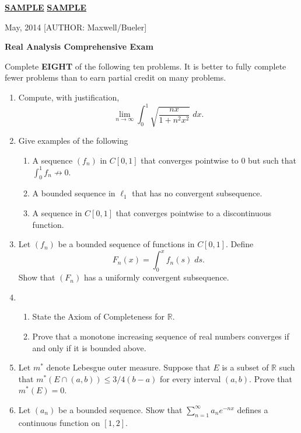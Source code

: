 \documentclass[12pt]{article}
\def\ra{\rightarrow}
\def\Reals{{\mathbb R}}
\begin{document}
\thispagestyle{empty}
\Large \noindent \underline{\textbf{SAMPLE}} \hfill\underline{\textbf{SAMPLE}}

\scriptsize {} May, 2014  \hfill  \tiny [AUTHOR: Maxwell/Bueler]
\normalsize\bigskip

\centerline{\large\textbf{Real Analysis Comprehensive Exam}} 
\bigskip

Complete {\bf EIGHT} of the following ten problems.  It is better to fully
complete fewer problems than to earn partial credit on many problems.
\bigskip
\begin{enumerate}

\item Compute, with justification, 
$$
\lim_{n\to\infty} \int_0^1 \sqrt{\frac{nx}{1+n^2x^2}}\; dx.
$$

\item Give examples of the following
\begin{enumerate}
	\item A sequence $(f_n)$ in $C[0,1]$ that converges pointwise to $0$
	 but such that $\int_0^1 f_n\not\ra 0$.  
	\item A bounded sequence in $\ell_1$ that has no convergent subsequence.
	\item A sequence in $C[0,1]$ that converges pointwise to a discontinuous function.
\end{enumerate}	

\item Let $(f_n)$ be a bounded sequence of functions in $C[0,1]$.
Define
$$
F_n(x) = \int_0^x f_n(s)\; ds.
$$
Show that $(F_n)$ has a uniformly convergent subsequence.

\item 
\begin{enumerate}
	\item State the Axiom of Completeness for $\Reals$.
	\item Prove that a monotone increasing sequence of real numbers converges if and only
	if it is bounded above.
\end{enumerate}

\item Let $m^*$ denote Lebesgue outer measure.  Suppose that $E$ is a subset of $\Reals$
such that $m^*(E\cap (a,b)) \le 3/4 (b-a)$ for every interval $(a,b)$. Prove that
$m^*(E)=0$.

\item Let $(a_n)$ be a bounded sequence.  Show that $\sum_{n=1}^\infty a_n e^{-nx}$
defines a continuous function on $[1,2]$.


\end{enumerate}
\end{document}
